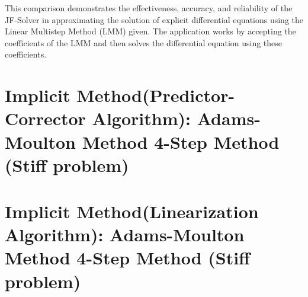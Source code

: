This comparison demonstrates the effectiveness, accuracy, and reliability of the JF-Solver in approximating the solution of explicit differential equations using the Linear Multistep Method (LMM) given. The application works by accepting the coefficients of the LMM and then solves the differential equation using these coefficients.

\section{Implicit Method(Predictor-Corrector Algorithm): Adams-Moulton Method 4-Step Method (Stiff problem)}


\section{Implicit Method(Linearization Algorithm): Adams-Moulton Method 4-Step Method (Stiff problem)}



